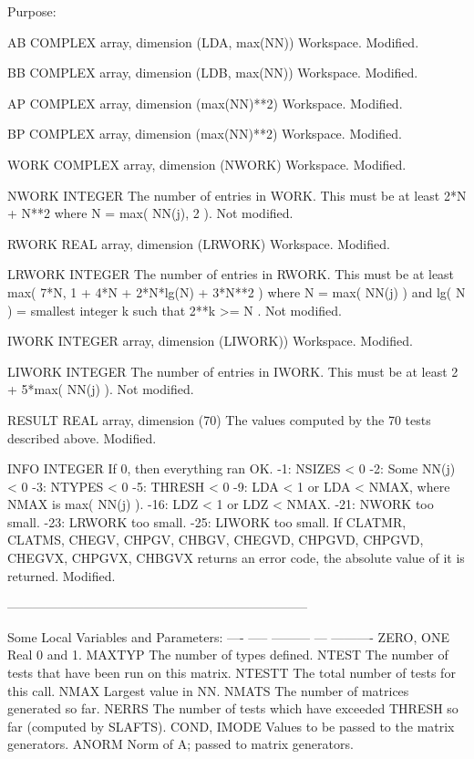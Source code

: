 \begin{DoxyParagraph}{Purpose\+: }
\begin{DoxyVerb}
  AB      COMPLEX array, dimension (LDA, max(NN))
          Workspace.
          Modified.

  BB      COMPLEX array, dimension (LDB, max(NN))
          Workspace.
          Modified.

  AP      COMPLEX array, dimension (max(NN)**2)
          Workspace.
          Modified.

  BP      COMPLEX array, dimension (max(NN)**2)
          Workspace.
          Modified.

  WORK    COMPLEX array, dimension (NWORK)
          Workspace.
          Modified.

  NWORK   INTEGER
          The number of entries in WORK.  This must be at least
          2*N + N**2  where  N = max( NN(j), 2 ).
          Not modified.

  RWORK   REAL array, dimension (LRWORK)
          Workspace.
          Modified.

  LRWORK  INTEGER
          The number of entries in RWORK.  This must be at least
          max( 7*N, 1 + 4*N + 2*N*lg(N) + 3*N**2 ) where
          N = max( NN(j) ) and lg( N ) = smallest integer k such
          that 2**k >= N .
          Not modified.

  IWORK   INTEGER array, dimension (LIWORK))
          Workspace.
          Modified.

  LIWORK  INTEGER
          The number of entries in IWORK.  This must be at least
          2 + 5*max( NN(j) ).
          Not modified.

  RESULT  REAL array, dimension (70)
          The values computed by the 70 tests described above.
          Modified.

  INFO    INTEGER
          If 0, then everything ran OK.
           -1: NSIZES < 0
           -2: Some NN(j) < 0
           -3: NTYPES < 0
           -5: THRESH < 0
           -9: LDA < 1 or LDA < NMAX, where NMAX is max( NN(j) ).
          -16: LDZ < 1 or LDZ < NMAX.
          -21: NWORK too small.
          -23: LRWORK too small.
          -25: LIWORK too small.
          If  CLATMR, CLATMS, CHEGV, CHPGV, CHBGV, CHEGVD, CHPGVD,
              CHPGVD, CHEGVX, CHPGVX, CHBGVX returns an error code,
              the absolute value of it is returned.
          Modified.

-----------------------------------------------------------------------

       Some Local Variables and Parameters:
       ---- ----- --------- --- ----------
       ZERO, ONE       Real 0 and 1.
       MAXTYP          The number of types defined.
       NTEST           The number of tests that have been run
                       on this matrix.
       NTESTT          The total number of tests for this call.
       NMAX            Largest value in NN.
       NMATS           The number of matrices generated so far.
       NERRS           The number of tests which have exceeded THRESH
                       so far (computed by SLAFTS).
       COND, IMODE     Values to be passed to the matrix generators.
       ANORM           Norm of A; passed to matrix generators.


\end{DoxyVerb}
\end{DoxyParagraph}
